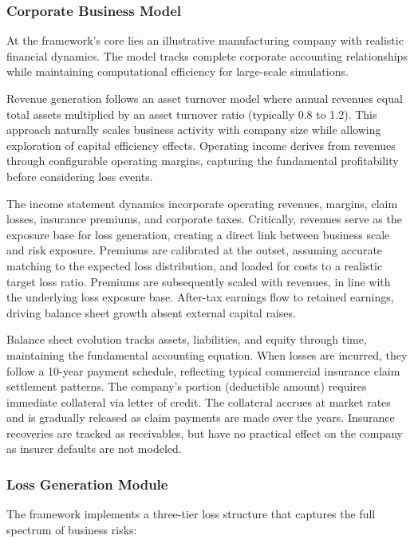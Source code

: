 \documentclass[11pt,letterpaper]{article}
\begin{document}
\subsubsection{Corporate Business Model}

At the framework's core lies an illustrative manufacturing company with realistic financial dynamics. The model tracks complete corporate accounting relationships while maintaining computational efficiency for large-scale simulations.

Revenue generation follows an asset turnover model where annual revenues equal total assets multiplied by an asset turnover ratio (typically 0.8 to 1.2). This approach naturally scales business activity with company size while allowing exploration of capital efficiency effects. Operating income derives from revenues through configurable operating margins, capturing the fundamental profitability before considering loss events.

The income statement dynamics incorporate operating revenues, margins, claim losses, insurance premiums, and corporate taxes. Critically, revenues serve as the exposure base for loss generation, creating a direct link between business scale and risk exposure. Premiums are calibrated at the outset, assuming accurate matching to the expected loss distribution, and loaded for costs to a realistic target loss ratio. Premiums are subsequently scaled with revenues, in line with the underlying loss exposure base. After-tax earnings flow to retained earnings, driving balance sheet growth absent external capital raises.

Balance sheet evolution tracks assets, liabilities, and equity through time, maintaining the fundamental accounting equation. When losses are incurred, they follow a 10-year payment schedule, reflecting typical commercial insurance claim settlement patterns. The company's portion (deductible amount) requires immediate collateral via letter of credit. The collateral accrues at market rates and is gradually released as claim payments are made over the years. Insurance recoveries are tracked as receivables, but have no practical effect on the company as insurer defaults are not modeled.

\subsubsection{Loss Generation Module}

The framework implements a three-tier loss structure that captures the full spectrum of business risks:
\end{document}
